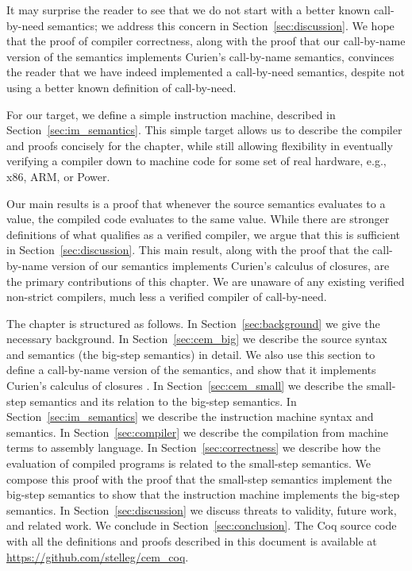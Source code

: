It may surprise the reader to see that we do not start with a better known
call-by-need semantics; we address this concern in
Section~\ref{sec:discussion}.  We hope that the proof of compiler correctness,
along with the proof that our call-by-name version of the semantics implements
Curien's call-by-name semantics, convinces the reader that we have indeed
implemented a call-by-need semantics, despite not using a better known
definition of call-by-need. 

For our target, we define a simple instruction machine, described in
Section~\ref{sec:im_semantics}. This simple target allows us to describe the
compiler and proofs concisely for the chapter, while still allowing
flexibility in eventually verifying a compiler down to machine code for some
set of real hardware, e.g., x86, ARM, or Power. 

Our main results is a proof that whenever the source semantics evaluates to a
value, the compiled code evaluates to the same value. While there are stronger
definitions of what qualifies as a verified compiler, we argue that this is
sufficient in Section~\ref{sec:discussion}. This main result, along with the
proof that the call-by-name version of our semantics implements Curien's
calculus of closures, are the primary contributions of this chapter. We are
unaware of any existing verified non-strict compilers, much less a verified
compiler of call-by-need. 

The chapter is structured as follows. In Section~\ref{sec:background} we give the
necessary background. In Section~\ref{sec:cem_big} we describe the source syntax
and semantics (the big-step \ce semantics) in detail.  We also use
this section to define a call-by-name version of the semantics, and
show that it implements Curien's calculus of closures \cite{curien1991abstract}.  In
Section~\ref{sec:cem_small} we describe the small-step \ce semantics
and its relation to the big-step semantics. In Section~\ref{sec:im_semantics}
we describe the instruction machine syntax and semantics. In
Section~\ref{sec:compiler} we describe the compilation from machine terms to
assembly language. In Section~\ref{sec:correctness} we describe how the evaluation
of compiled programs is related to the small-step \ce semantics. We
compose this proof with the proof that the small-step semantics implement the
big-step semantics to show that the instruction machine implements the big-step
semantics. In Section~\ref{sec:discussion} we discuss threats to validity,
future work, and related work. We conclude in Section~\ref{sec:conclusion}. The
Coq source code with all the definitions and proofs described in this document
is available at \url{https://github.com/stelleg/cem\_coq}. 
